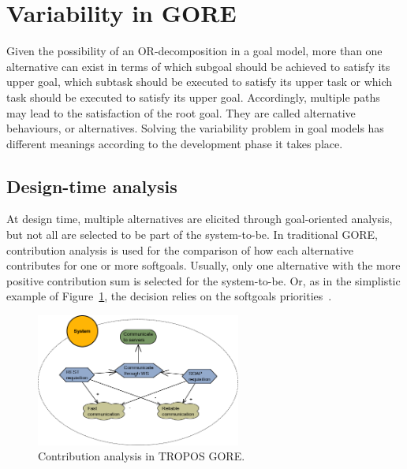 

\section{Variability in GORE}\label{sec:variability}

Given the possibility of an OR-decomposition in a goal model, more than one alternative can exist in terms of which subgoal should be achieved to satisfy its upper goal,  which subtask should be executed to satisfy its upper task or which task should be executed to satisfy its upper goal. Accordingly, multiple paths may lead to the satisfaction of the root goal. They are called alternative behaviours, or alternatives. Solving the variability problem in goal models has different meanings according to the development phase it takes place. 

\subsection{Design-time analysis}

At design time, multiple alternatives are elicited through goal-oriented analysis, but not all are selected to be part of the system-to-be. In traditional GORE, contribution analysis is used for the comparison of how each alternative contributes for one or more softgoals. Usually, only one alternative with the more positive contribution sum is selected for the system-to-be. Or, as in the simplistic example of Figure~\ref{fig:GORE_CA}, the decision relies on the softgoals priorities~\cite{Yu:2013}.

\begin{figure}[h!]
\centering
\includegraphics[width=0.6\textwidth]{imgs/GORE_CA.png}
\caption{Contribution analysis in TROPOS GORE.}
\label{fig:GORE_CA}
\end{figure}

